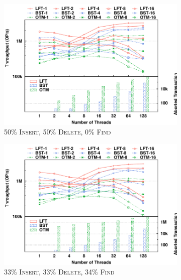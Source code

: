\documentclass{sig-alternate-05-2015}
\begin{document}
\begin{figure}[t]
	\begin{subfigure}{0.325\textwidth}
		\centering
		\includegraphics[width=1\columnwidth]{./data/amdskip50ins10kfilled.pdf}
		\caption{50\% \textsc{Insert}, 50\% \textsc{Delete}, 0\% \textsc{Find}}
		\label{fig:txnskip50}
	\end{subfigure}
	\hfill
	\begin{subfigure}{0.325\textwidth}
		\centering
		\includegraphics[width=1\columnwidth]{./data/amdskip33ins10kfilled.pdf}
		\caption{33\% \textsc{Insert}, 33\% \textsc{Delete}, 34\% \textsc{Find}}
		\label{fig:txnskip33}
	\end{subfigure}
	\hfill
	\begin{subfigure}{0.325\textwidth}
		\centering

\end{subfigure}
\end{figure}
\end{document}
